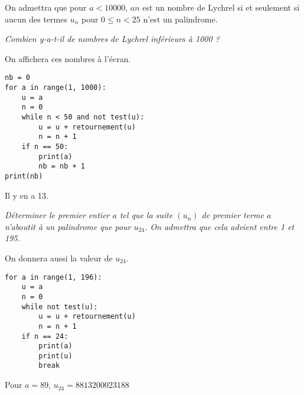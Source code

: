 On admettra que pour $a < 10000$, $an$ est un nombre de Lychrel si et seulement si aucun des termes $u_n$ pour $0\le n < 25$ n'est un palindrome.
\begin{Exercise}\it Combien y-a-t-il de nombres de Lychrel inférieurs à 1000 ?

On affichera ces nombres à l'écran.
\end{Exercise}
\begin{Answer}
\begin{lstlisting}
nb = 0
for a in range(1, 1000):
    u = a
    n = 0
    while n < 50 and not test(u):
        u = u + retournement(u)
        n = n + 1
    if n == 50:
        print(a)
        nb = nb + 1
print(nb)
\end{lstlisting}
Il y en a 13.
\end{Answer}
\begin{Exercise}\it Déterminer le premier entier $a$ tel que la suite $(u_n)$ de premier terme $a$ n'aboutit à un palindrome que pour $u_{24}$. On admettra que cela advient entre 1  et 195.

On donnera aussi la valeur de $u_{24}$.
\end{Exercise}
\begin{Answer}
\begin{lstlisting}
for a in range(1, 196):
    u = a
    n = 0
    while not test(u):
        u = u + retournement(u)
        n = n + 1
    if n == 24:
        print(a)
        print(u)
        break
\end{lstlisting}
Pour $a = 89$, $u_{24} = 8813200023188$
\end{Answer}
